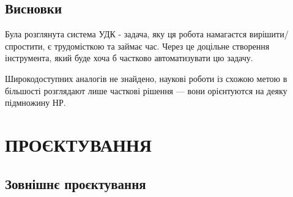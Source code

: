 \documentclass[14pt]{extarticle}
\let\oldsection\section
\renewcommand{\section}{\clearpage\oldsection}
\begin{document}
  \subsection{Висновки}

  Була розглянута система УДК - задача,
  яку ця робота намагаєтся вирішити/спростити,
  є трудомісткою та займає час.
  Через це доцільне створення інструмента,
  який буде хоча б частково автоматизувати цю задачу.

  Широкодоступних аналогів не знайдено,
  наукові роботи із схожою метою в більшості розглядают лише часткові рішення
  --- вони орієнтуются на деяку підмножину НР.

  \section{ПРОЄКТУВАННЯ}
  \subsection{Зовнішнє проєктування}
\end{document}
